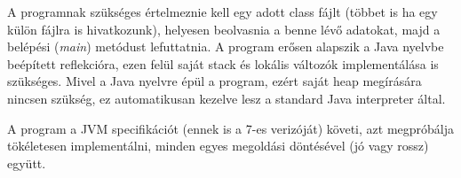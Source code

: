 A programnak szükséges értelmeznie kell egy adott class fájlt (többet is ha egy külön fájlra is hivatkozunk), helyesen beolvasnia a benne lévő adatokat, majd a belépési (\textit{main}) metódust lefuttatnia. A program erősen alapszik a Java nyelvbe beépített reflekcióra, ezen felül saját stack és lokális változók implementálása is szükséges. Mivel a Java nyelvre épül a program, ezért saját heap megírására nincsen szükség, ez automatikusan kezelve lesz a standard Java interpreter által.

A program a JVM specifikációt\cite{jvmspecification} (ennek is a 7-es verizóját) követi, azt megpróbálja tökéletesen implementálni, minden egyes megoldási döntésével (jó vagy rossz) együtt.
